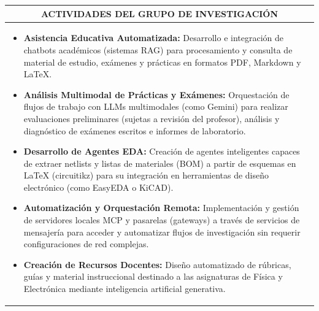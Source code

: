 \documentclass[12pt, a4paper]{article}
\begin{document}
\newpage

\noindent
\begin{tabularx}{\textwidth}{|X|}
\hline
\multicolumn{1}{|c|}{\cellcolor[gray]{0.9}\textbf{ACTIVIDADES DEL GRUPO DE INVESTIGACIÓN}} \\
\hline
\vspace{0.2cm}
\begin{itemize}\small
    \item \textbf{Asistencia Educativa Automatizada:} Desarrollo e integración de chatbots académicos (sistemas RAG) para procesamiento y consulta de material de estudio, exámenes y prácticas en formatos PDF, Markdown y LaTeX.
    \item \textbf{Análisis Multimodal de Prácticas y Exámenes:} Orquestación de flujos de trabajo con LLMs multimodales (como Gemini) para realizar evaluaciones preliminares (sujetas a revisión del profesor), análisis y diagnóstico de exámenes escritos e informes de laboratorio.
    \item \textbf{Desarrollo de Agentes EDA:} Creación de agentes inteligentes capaces de extraer netlists y listas de materiales (BOM) a partir de esquemas en LaTeX (circuitikz) para su integración en herramientas de diseño electrónico (como EasyEDA o KiCAD).
    \item \textbf{Automatización y Orquestación Remota:} Implementación y gestión de servidores locales MCP y pasarelas (gateways) a través de servicios de mensajería para acceder y automatizar flujos de investigación sin requerir configuraciones de red complejas.
    \item \textbf{Creación de Recursos Docentes:} Diseño automatizado de rúbricas, guías y material instruccional destinado a las asignaturas de Física y Electrónica mediante inteligencia artificial generativa.
\end{itemize}
\vspace{10cm} \\
\hline
\end{tabularx}

\newpage
\end{document}
